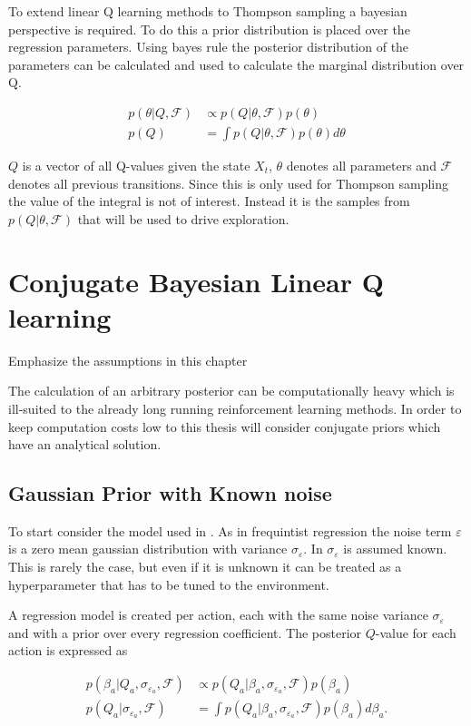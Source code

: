 To extend linear Q learning methods to Thompson sampling a bayesian perspective is required. To do this a prior distribution is placed over the regression parameters. Using bayes rule the posterior distribution of the parameters can be calculated and used to calculate the marginal distribution over Q.

\begin{align*}
p(\theta |Q, \mathcal{F}) &\propto p(Q| \theta, \mathcal{F})p(\theta) \\
p(Q) &= \int p(Q|\theta, \mathcal{F}) p(\theta) d\theta
\end{align*}

$Q$ is a vector of all Q-values given the state $X_t$, $\theta$ denotes all parameters and $\mathcal{F}$ denotes all previous transitions. Since this is only used for Thompson sampling the value of the integral is not of interest. Instead it is the samples from $p(Q|\theta, \mathcal{F})$ that will be used to drive exploration.

\section{Conjugate Bayesian Linear Q learning}

\todo Emphasize the assumptions in this chapter

The calculation of an arbitrary posterior can be computationally heavy which is ill-suited to the already long running reinforcement learning methods. In order to keep computation costs low to this thesis will consider conjugate priors which have an analytical solution.

\subsection{Gaussian Prior with Known noise}

To start consider the model used in \cite{azziz_2018}. As in frequintist regression the noise term $\varepsilon$ is a zero mean gaussian distribution with variance $\sigma_\varepsilon$. In \cite{azziz_2018} $\sigma_\varepsilon$ is assumed known. This is rarely the case, but even if it is unknown it can be treated as a hyperparameter that has to be tuned to the environment. 

A regression model is created per action, each with the same noise variance $\sigma_\varepsilon$ and with a prior over every regression coefficient. The posterior $Q$-value for each action is expressed as 

\begin{align*}
    p(\beta_a |Q_a, \sigma_{\varepsilon_a}, \mathcal{F}) &\propto p(Q_a| \beta_a, \sigma_{\varepsilon_a}, \mathcal{F})p(\beta_a) \\
    p(Q_a|\sigma_{\varepsilon_a}, \mathcal{F}) &= \int p(Q_a|\beta_a, \sigma_{\varepsilon_a}, \mathcal{F}) p(\beta_a)d\beta_a.
\end{align*}


